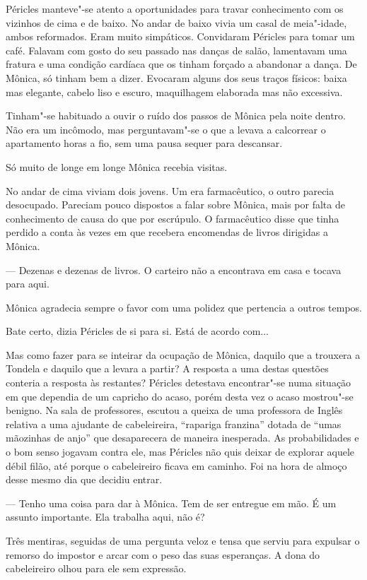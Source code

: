 Péricles manteve"-se atento a oportunidades para travar conhecimento com
os vizinhos de cima e de baixo. No andar de baixo vivia um casal de
meia"-idade, ambos reformados. Eram muito simpáticos. Convidaram Péricles
para tomar um café. Falavam com gosto do seu passado nas danças de
salão, lamentavam uma fratura e uma condição cardíaca que os tinham
forçado a abandonar a dança. De Mônica, só tinham bem a dizer. Evocaram
alguns dos seus traços físicos: baixa mas elegante, cabelo liso e
escuro, maquilhagem elaborada mas não excessiva.

Tinham"-se habituado a ouvir o ruído dos passos de Mônica pela noite
dentro. Não era um incômodo, mas perguntavam"-se o que a levava a
calcorrear o apartamento horas a fio, sem uma pausa sequer para
descansar.

Só muito de longe em longe Mônica recebia visitas.

No andar de cima viviam dois jovens. Um era farmacêutico, o outro
parecia desocupado. Pareciam pouco dispostos a falar sobre Mônica, mais
por falta de conhecimento de causa do que por escrúpulo. O farmacêutico
disse que tinha perdido a conta às vezes em que recebera encomendas de
livros dirigidas a Mônica.

--- Dezenas e dezenas de livros. O carteiro não a encontrava em casa e
tocava para aqui.

Mônica agradecia sempre o favor com uma polidez que pertencia a outros
tempos.

Bate certo, dizia Péricles de si para si. Está de acordo com...

Mas como
fazer para se inteirar da ocupação de Mônica, daquilo que a trouxera a
Tondela e daquilo que a levara a partir? A resposta a uma destas
questões conteria a resposta às
restantes? Péricles detestava encontrar"-se numa situação em que dependia
de um capricho do acaso, porém desta vez o acaso mostrou"-se benigno. Na
sala de professores, escutou a queixa de uma professora de Inglês
relativa a uma ajudante de cabeleireira, ``rapariga franzina'' dotada de
``umas mãozinhas de anjo'' que desaparecera de maneira inesperada. As
probabilidades e o bom senso jogavam contra ele, mas Péricles não quis
deixar de explorar aquele débil filão, até porque o cabeleireiro
ficava em caminho. Foi na hora de almoço desse mesmo dia que decidiu
entrar.

--- Tenho uma coisa para dar à Mônica. Tem de ser entregue em mão. É um
  assunto importante. Ela trabalha aqui, não é?


Três mentiras, seguidas de uma pergunta veloz e tensa que serviu para
expulsar o remorso do impostor e arcar com o peso das suas esperanças. A
dona do cabeleireiro olhou para ele sem expressão.

